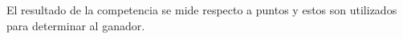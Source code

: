  \noindent El resultado de la competencia se mide respecto a puntos y estos son
 utilizados para determinar al ganador.






%

